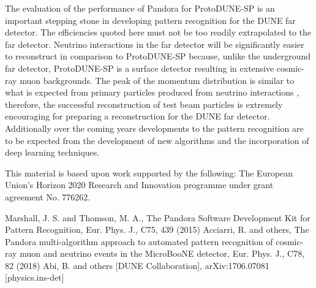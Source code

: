 The evaluation of the performance of Pandora for ProtoDUNE-SP is an important stepping stone in developing pattern recognition for the DUNE far detector.  The efficiencies quoted here must not be too readily extrapolated to the far detector.  Neutrino interactions in the far detector will be significantly easier to reconstruct in comparison to ProtoDUNE-SP because, unlike the underground far detector, ProtoDUNE-SP is a surface detector resulting in extensive cosmic-ray muon backgrounds.  The peak of the momentum distribution is  similar to what is expected from primary particles produced from neutrino interactions , therefore, the successful reconstruction of test beam particles is extremely encouraging for preparing a reconstruction for the DUNE far detector.  Additionally over the coming years developments to the pattern recognition are to be expected from the development of new algorithms and the incorporation of deep learning techniques.  

\begin{acknowledgements}
This material is based upon work supported by the following: The European Union’s Horizon 2020 Research and Innovation programme under grant agreement No. 776262.
\end{acknowledgements}


\begin{thebibliography}{}
%
%
Marshall, J. S. and Thomson, M. A., The Pandora Software Development Kit for Pattern Recognition, Eur. Phys. J., C75, 439 (2015)
Acciarri, R. and others, The Pandora multi-algorithm approach to automated pattern recognition of cosmic-ray muon and neutrino events in the MicroBooNE detector, Eur. Phys. J., C78, 82 (2018)
Abi, B. and others [DUNE Collaboration], arXiv:1706.07081 [physics.ins-det]
\end{thebibliography}



